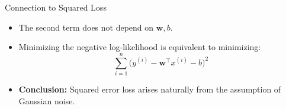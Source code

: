 \documentclass[../../main.tex]{subfiles}
\begin{document}
\begin{frame}{Connection to Squared Loss}
\begin{itemize}
    \item The second term does not depend on $\mathbf{w}, b$.
    \item Minimizing the negative log-likelihood is equivalent to minimizing:
    \[
    \sum_{i=1}^n \big(y^{(i)} - \mathbf{w}^\top x^{(i)} - b \big)^2
    \]
    \item \textbf{Conclusion:} Squared error loss arises naturally from the assumption of Gaussian noise.
\end{itemize}
\end{frame}












\end{document}
